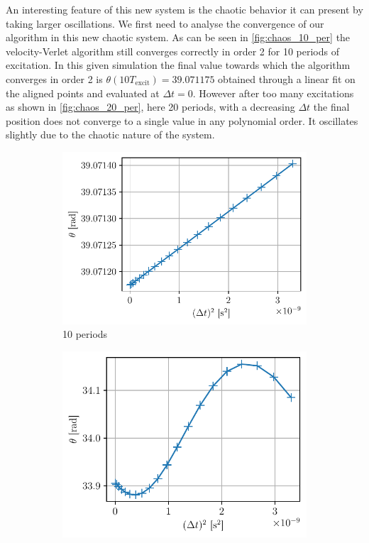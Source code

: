 An interesting feature of this new system is the chaotic behavior it can present by taking larger oscillations. We first need to analyse the convergence of our algorithm in this new chaotic system. As can be seen in \autoref{fig:chaos_10_per} the velocity-Verlet algorithm still converges correctly in order 2 for 10 periods of excitation. In this given simulation the final value towards which the algorithm converges in order 2 is $\theta(10T_\mathrm{excit}) = 39.071175$ obtained through a linear fit on the aligned points and evaluated at $\Delta t = 0$. However after too many excitations as shown in \autoref{fig:chaos_20_per}, here 20 periods, with a decreasing $\Delta t$ the final position does not converge to a single value in any polynomial order. It oscillates slightly due to the chaotic nature of the system.
\begin{figure}[h]
    \centering
    \begin{subfigure}{0.48\linewidth}
        \centering
        \includegraphics[width=\linewidth]{figures/chaos1_10_periods_conv.pdf}
        \caption{10 periods}
        \label{fig:chaos_10_per}
    \end{subfigure}
    \begin{subfigure}{0.48\linewidth}
        \centering
        \includegraphics[width=\linewidth]{figures/chaos1_20_periods_conv.pdf}

\end{subfigure}
\end{figure}
